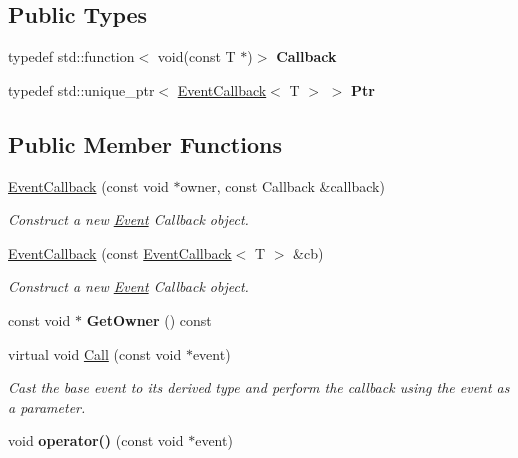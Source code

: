 \subsection*{Public Types}
\begin{DoxyCompactItemize}
\item 
\mbox{\label{classEventCallback_a112460a3346f78962e5280945bc8e0ce}} 
typedef std\+::function$<$ void(const T $\ast$)$>$ {\bfseries Callback}
\item 
\mbox{\label{classEventCallback_ad2ce15e4f574dcc5a87e80fbb2f92e71}} 
typedef std\+::unique\+\_\+ptr$<$ \hyperlink{classEventCallback}{Event\+Callback}$<$ T $>$ $>$ {\bfseries Ptr}
\end{DoxyCompactItemize}
\subsection*{Public Member Functions}
\begin{DoxyCompactItemize}
\item 
\hyperlink{classEventCallback_ab3a3dabfd2f7a9e13905a2aa9dc3e237}{Event\+Callback} (const void $\ast$owner, const Callback \&callback)
\begin{DoxyCompactList}\small\item\em Construct a new \hyperlink{classEvent}{Event} Callback object. \end{DoxyCompactList}\item 
\hyperlink{classEventCallback_a1d072cf214664b7cc9d4fbf3ec8ec9ca}{Event\+Callback} (const \hyperlink{classEventCallback}{Event\+Callback}$<$ T $>$ \&cb)
\begin{DoxyCompactList}\small\item\em Construct a new \hyperlink{classEvent}{Event} Callback object. \end{DoxyCompactList}\item 
\mbox{\label{classEventCallback_afcc0df21beca3957c0b4722f201dc922}} 
const void $\ast$ {\bfseries Get\+Owner} () const
\item 
virtual void \hyperlink{classEventCallback_ad34e4a69e56733e07342d0c56cd15dfc}{Call} (const void $\ast$event)
\begin{DoxyCompactList}\small\item\em Cast the base event to its derived type and perform the callback using the event as a parameter. \end{DoxyCompactList}\item 
\mbox{\label{classEventCallback_aab5c8d82f8c4b712e30c258a7f733fc1}} 
void {\bfseries operator()} (const void $\ast$event)
\end{DoxyCompactItemize}
